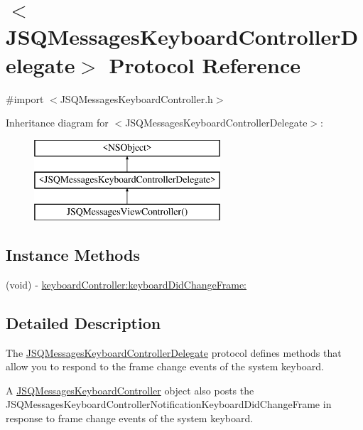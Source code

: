 \hypertarget{protocol_j_s_q_messages_keyboard_controller_delegate-p}{}\section{$<$J\+S\+Q\+Messages\+Keyboard\+Controller\+Delegate$>$ Protocol Reference}
\label{protocol_j_s_q_messages_keyboard_controller_delegate-p}


{\ttfamily \#import $<$J\+S\+Q\+Messages\+Keyboard\+Controller.\+h$>$}

Inheritance diagram for $<$J\+S\+Q\+Messages\+Keyboard\+Controller\+Delegate$>$\+:\begin{figure}[H]
\begin{center}
\leavevmode
\includegraphics[height=3.000000cm]{protocol_j_s_q_messages_keyboard_controller_delegate-p}
\end{center}
\end{figure}
\subsection*{Instance Methods}
\begin{DoxyCompactItemize}
\item 
(void) -\/ \hyperlink{protocol_j_s_q_messages_keyboard_controller_delegate-p_a3973bd7ee8404e95d19ac0f13ad88833}{keyboard\+Controller\+:keyboard\+Did\+Change\+Frame\+:}
\end{DoxyCompactItemize}


\subsection{Detailed Description}
The {\ttfamily \hyperlink{protocol_j_s_q_messages_keyboard_controller_delegate-p}{J\+S\+Q\+Messages\+Keyboard\+Controller\+Delegate}} protocol defines methods that allow you to respond to the frame change events of the system keyboard.

A {\ttfamily \hyperlink{interface_j_s_q_messages_keyboard_controller}{J\+S\+Q\+Messages\+Keyboard\+Controller}} object also posts the {\ttfamily J\+S\+Q\+Messages\+Keyboard\+Controller\+Notification\+Keyboard\+Did\+Change\+Frame} in response to frame change events of the system keyboard. 

